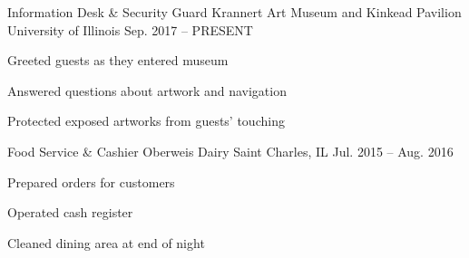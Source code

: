 

\begin{cventries}

  \cventry
    {Information Desk \& Security Guard} %
    {Krannert Art Museum and Kinkead Pavilion} %
    {University of Illinois} %
    {Sep. 2017 -- PRESENT} %
    {
      \begin{cvitems} %
        \item {Greeted guests as they entered museum}
        \item {Answered questions about artwork and navigation}
        \item {Protected exposed artworks from guests' touching}
      \end{cvitems}
    }

  \cventry
    {Food Service \& Cashier} %
    {Oberweis Dairy} %
    {Saint Charles, IL} %
    {Jul. 2015 -- Aug. 2016} %
    {
      \begin{cvitems}
        \item {Prepared orders for customers}
        \item {Operated cash register}
        \item {Cleaned dining area at end of night}
      \end{cvitems}
    }

\end{cventries}
